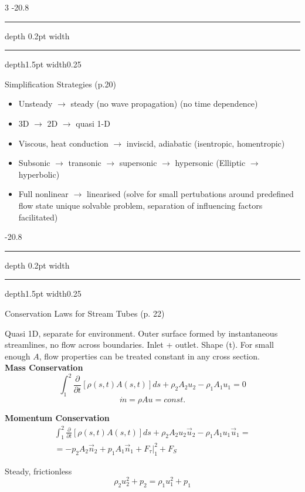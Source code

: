 \documentclass[8pt, landscape, fleqn]{scrartcl}
\makeatletter
\renewcommand{\section}{\@startsection{section}{1}{0mm}%
{-2\baselineskip}{0.8\baselineskip}%
{\hrule depth 0.2pt width\columnwidth\hrule depth1.5pt
width0.25\columnwidth\vspace*{1.2em}\Large\bfseries\rmfamily}}
\makeatother
\begin{document}
\begin{multicols*}{3}
\section{Simplification Strategies (p.20)}

\begin{itemize}
    \item Unsteady $\rightarrow$ steady (no wave propagation) (no time dependence)
    \item 3D $\rightarrow$ 2D $\rightarrow$ quasi 1-D
    \item Viscous, heat conduction $\rightarrow$ inviscid, adiabatic (isentropic, homentropic)
    \item Subsonic $\rightarrow$ transonic $\rightarrow$ supersonic $\rightarrow$ hypersonic (Elliptic $\rightarrow$ hyperbolic)
    \item Full nonlinear $\rightarrow$ linearised (solve for small pertubations around predefined flow state unique solvable problem, separation of influencing factors facilitated)
\end{itemize}

\section{Conservation Laws for Stream Tubes (p. 22)}

Quasi 1D, separate for environment. Outer surface formed by instantaneous streamlines, no flow across boundaries. Inlet + outlet. Shape (t). For small enough $A$, flow properties can be treated constant in any cross section. \\

\textbf{Mass Conservation}
\begin{equation*}
    \int_1^2 \frac{\partial}{\partial t}\left[ \rho(s,t) A(s,t)\right] ds + \rho_2 A_2 u_2 - \rho_1 A_1 u_1 = 0
\end{equation*}
\begin{equation*}
    \dot{m} = \rho A u = const.
\end{equation*}

\textbf{Momentum Conservation}
\begin{align*}
    \int_1^2 \frac{\partial}{\partial t} \left[ \rho(s,t) A(s,t) \right] ds + \rho_2 A_2 u_2 \vec{u}_2 - \rho_1 A_1 u_1 \vec{u}_1 = \\
    = -p_2 A_2 \vec{n}_2 + p_1 A_1 \vec{n}_1 + F_\tau |_1^2 + F_S
\end{align*}

Steady, frictionless
\begin{equation*}
    \rho_2 u_2^2 + p_2 = \rho_1 u_1^2 + p_1
\end{equation*}


\end{multicols*}
\end{document}
